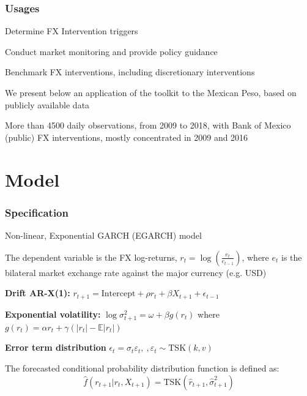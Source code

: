 \documentclass{beamer}
\newenvironment{largeitemize}{\itemize\addtolength{\itemsep}{10pt}}{\enditemize}
\newenvironment{largeenumerate}{\enumerate\addtolength{\itemsep}{10pt}}{\endenumerate}
\begin{document}
\begin{frame}
  \frametitle{Usages}    
  \begin{largeenumerate}
    \item Determine FX Intervention triggers
    \item Conduct market monitoring and provide policy guidance
    \item Benchmark FX interventions, including discretionary interventions
    \end{largeenumerate}
    
    \bigskip
    
  \begin{largeitemize}
    \item We present below an application of the toolkit to the Mexican Peso, based on publicly
      available data
    \item More than 4500 daily observations, from 2009 to 2018, with Bank of
      Mexico (public) FX interventions, mostly concentrated in 2009 and 2016
    \end{largeitemize}
    
\end{frame}


\section{Model}

\begin{frame}
  \frametitle{Specification}
\begin{largeitemize}  
\item Non-linear, Exponential GARCH (EGARCH) model 
\item The dependent variable is the FX log-returns, $r_t = \log(\frac{e_t}{e_{t-1}})$, where
$e_t$ is the bilateral market exchange rate against the major currency
(e.g. USD)
\item \textbf{Drift AR-X(1):} $r_{t+1} = \text{Intercept} +
  \rho r_t + \beta X_{t+1} + \epsilon_{t-1}$\\  
\item \textbf{Exponential volatility:} $\log \sigma_{t+1}^{2} = \omega + \beta
g(r_t)$ where $g(r_t) = \alpha r_t + \gamma(|r_t|-\mathbb{E}|r_t|)$

\item \textbf{Error term distribution} $\epsilon_t = \sigma_t \varepsilon_t,
  \ , \varepsilon_t \sim \text{TSK}(k,v)$\\
  
\item The forecasted conditional probability distribution function is defined as:
      \begin{equation*}
        \hat{f}(r_{t+1} | r_{t}, X_{t+1}) = \text{TSK}(\hat{r}_{t+1}, \hat{\sigma}_{t+1}^{2})
      \end{equation*}      
\end{largeitemize}
\end{frame}
\end{document}
